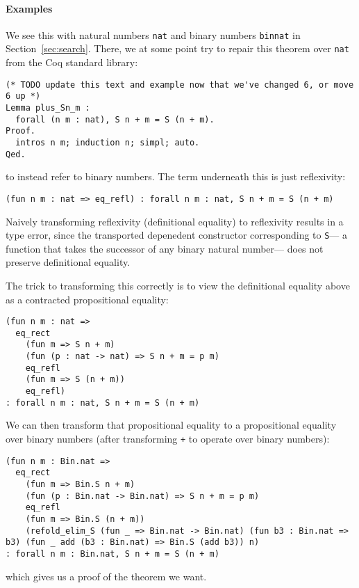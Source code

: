 \paragraph{Examples}

We see this with natural numbers \lstinline{nat} and binary numbers \lstinline{binnat}
in Section~\ref{sec:search}.
There, we at some point try to repair this theorem over \lstinline{nat} from the Coq standard library:

\begin{lstlisting}
(* TODO update this text and example now that we've changed 6, or move 6 up *)
Lemma plus_Sn_m :
  forall (n m : nat), S n + m = S (n + m).
Proof.
  intros n m; induction n; simpl; auto.
Qed.
\end{lstlisting}
to instead refer to binary numbers.
The term underneath this is just reflexivity:

\begin{lstlisting}
(fun n m : nat => eq_refl) : forall n m : nat, S n + m = S (n + m)
\end{lstlisting}
Naively transforming reflexivity (definitional equality) to reflexivity results in a type error,
since the transported depenedent constructor corresponding to \lstinline{S}---
a function that takes the successor of any binary natural number---
does not preserve definitional equality.

The trick to transforming this correctly is to view the definitional equality above as a contracted propositional equality:

\begin{lstlisting}
(fun n m : nat =>
  eq_rect
    (fun m => S n + m)
    (fun (p : nat -> nat) => S n + m = p m)
    eq_refl
    (fun m => S (n + m))
    eq_refl)
: forall n m : nat, S n + m = S (n + m)
\end{lstlisting}
We can then transform that propositional equality to a propositional equality over binary numbers (after transforming \lstinline{+} to operate
over binary numbers):

\begin{lstlisting}
(fun n m : Bin.nat =>
  eq_rect
    (fun m => Bin.S n + m)
    (fun (p : Bin.nat -> Bin.nat) => S n + m = p m)
    eq_refl
    (fun m => Bin.S (n + m))
    (refold_elim_S (fun _ => Bin.nat -> Bin.nat) (fun b3 : Bin.nat => b3) (fun _ add (b3 : Bin.nat) => Bin.S (add b3)) n)
: forall n m : Bin.nat, S n + m = S (n + m)
\end{lstlisting}
which gives us a proof of the theorem we want.

